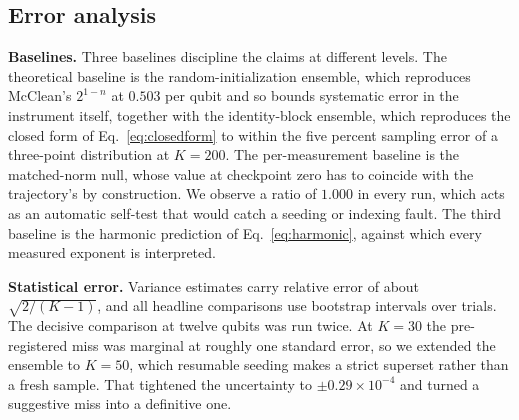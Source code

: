 \documentclass[conference]{IEEEtran}%
\begin{document}
\subsection{Error analysis}\label{sec:err}
\textbf{Baselines.} Three baselines discipline the claims at different levels. The theoretical baseline is the random-initialization ensemble, which reproduces McClean's $2^{1-n}$ at $0.503$ per qubit and so bounds systematic error in the instrument itself, together with the identity-block ensemble, which reproduces the closed form of Eq.~\eqref{eq:closedform} to within the five percent sampling error of a three-point distribution at $K{=}200$. The per-measurement baseline is the matched-norm null, whose value at checkpoint zero has to coincide with the trajectory's by construction. We observe a ratio of $1.000$ in every run, which acts as an automatic self-test that would catch a seeding or indexing fault. The third baseline is the harmonic prediction of Eq.~\eqref{eq:harmonic}, against which every measured exponent is interpreted.

\textbf{Statistical error.} Variance estimates carry relative error of about $\sqrt{2/(K-1)}$, and all headline comparisons use bootstrap intervals over trials. The decisive comparison at twelve qubits was run twice. At $K{=}30$ the pre-registered miss was marginal at roughly one standard error, so we extended the ensemble to $K{=}50$, which resumable seeding makes a strict superset rather than a fresh sample. That tightened the uncertainty to $\pm0.29\times10^{-4}$ and turned a suggestive miss into a definitive one.
\end{document}
